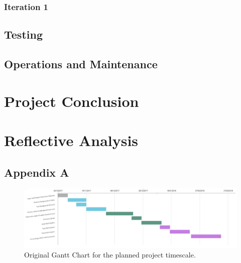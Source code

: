 \documentclass[11pt,a4paper]{report}
\begin{document}
\subsection{Iteration 1}
\pagebreak
\section{Testing}

\section{Operations and Maintenance}

\chapter{Project Conclusion}

\chapter{Reflective Analysis}

\renewcommand\bibname{References}

\pagebreak
\clearpage

\appendix
{}
\section{Appendix A}

\begin{figure}[H]
 \centering
 \includegraphics[scale = 0.33]{Original_gantt_chart.png}
 \caption{Original Gantt Chart for the planned project timescale.}
 \label{fig:OriginalGantt}
\end{figure}
\end{document}
